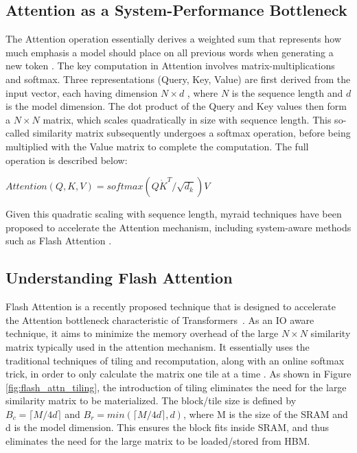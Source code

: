 \subsection{Attention as a System-Performance Bottleneck} The Attention operation essentially derives a weighted sum that represents how much emphasis a model should place on all previous words when generating a new token \cite{vaswani2023attention}. The key computation in Attention involves matrix-multiplications and softmax. Three representations (Query, Key, Value) are first derived from the input vector, each having dimension $N\times d$ , where $N$  is the sequence length and $d$ is the model dimension. The dot product of the Query and Key values then form a $N\times N$  matrix, which scales quadratically in size with sequence length. This so-called similarity matrix subsequently undergoes a softmax operation, before being multiplied with the Value matrix to complete the computation. The full operation is described below:

\begin{center}
    $Attention(Q,K,V)=softmax(Q\dot K^T / \sqrt{d_k}) V$
\end{center}

Given this quadratic scaling with sequence length, myraid techniques have been proposed to accelerate the Attention mechanism, including system-aware methods such as Flash Attention \cite{dao2022flashattention}.

\subsection{Understanding Flash Attention} Flash Attention is a recently proposed technique that is designed to accelerate the Attention bottleneck characteristic of Transformers~\cite{dao2022flashattention}. As an IO aware technique, it aims to minimize the memory overhead of the large $N\times N$ similarity matrix typically used in the attention mechanism. It essentially uses the traditional techniques of tiling and recomputation, along with an online softmax trick, in order to only calculate the matrix one tile at a time \cite{dao2022flashattention}. As shown in Figure \ref{fig:flash_attn_tiling}, the introduction of tiling eliminates the need for the large similarity matrix to be materialized. The block/tile size is defined by $B_c = \lceil M/4d \rceil$ and $B_r = min(\lceil M/4d \rceil, d)$, where M is the size of the SRAM and d is the model dimension. This ensures the block fits inside SRAM, and thus eliminates the need for the large matrix to be loaded/stored from HBM.

